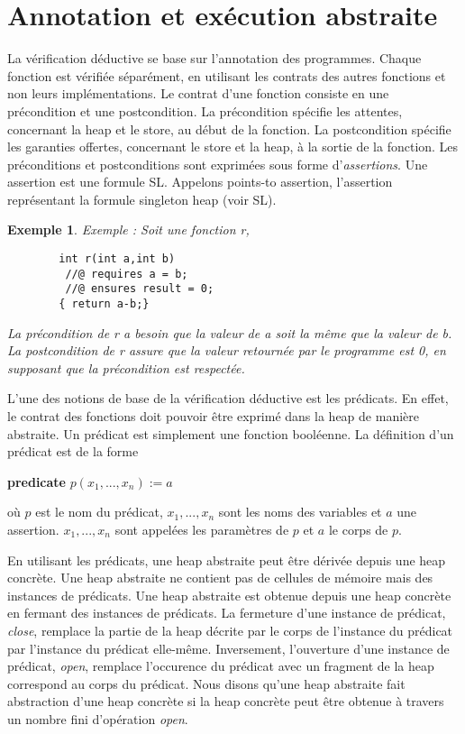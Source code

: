 \documentclass[9pt,openany]{book}
\newtheorem{exemple}{Exemple}
\begin{document}
	\section{Annotation et ex\'ecution abstraite}
		La v\'erification d\'eductive se base sur l'annotation des programmes. Chaque fonction est v\'erifi\'ee s\'epar\'ement, en utilisant les contrats des autres fonctions et non leurs impl\'ementations. Le contrat d'une fonction consiste en une pr\'econdition et une postcondition. La pr\'econdition sp\'ecifie les attentes, concernant la heap et le store, au d\'ebut de la fonction. La postcondition sp\'ecifie les garanties offertes, concernant le store et la heap, \`a la sortie de la fonction. Les pr\'econditions et postconditions sont exprim\'ees sous forme d'\textit{assertions}. Une assertion est une formule SL. Appelons points-to assertion, l'assertion repr\'esentant la formule singleton heap (voir SL).
		\begin{exemple}
		Exemple : Soit une fonction r,
		\begin{lstlisting}
		int r(int a,int b)
		 //@ requires a = b;
		 //@ ensures result = 0;
		{ return a-b;}
		\end{lstlisting}
		La pr\'econdition de r a besoin que la valeur de a soit la m\^eme que la valeur de b. La postcondition de r assure que la valeur retourn\'ee par le programme est 0, en supposant que la pr\'econdition est respect\'ee.
		\end{exemple}
	L'une des notions de base de la v\'erification d\'eductive est les pr\'edicats. En effet, le contrat des fonctions doit pouvoir \^etre exprim\'e dans la heap de mani\`ere abstraite. Un pr\'edicat est simplement une fonction bool\'eenne. La d\'efinition d'un pr\'edicat est de la forme
	\begin{center}
	
\textbf{predicate} $p(x_1,...,x_n):=a$

	\end{center}
o\`u $p$ est le nom du pr\'edicat, $x_1,...,x_n$ sont les noms des variables et $a$ une assertion. $x_1,...,x_n$ sont appel\'ees les param\`etres de $p$ et $a$ le corps de $p$.\par
	En utilisant les pr\'edicats, une heap abstraite peut \^etre d\'eriv\'ee depuis une heap concr\`ete. Une heap abstraite ne contient pas de cellules de m\'emoire mais des instances de pr\'edicats. Une heap abstraite est obtenue depuis une heap concr\`ete en fermant des instances de pr\'edicats. La fermeture d'une instance de pr\'edicat, \textit{close}, remplace la partie de la heap d\'ecrite par le corps de l'instance du pr\'edicat par l'instance du pr\'edicat elle-m\^eme. Inversement, l'ouverture d'une instance de pr\'edicat, \textit{open}, remplace l'occurence du pr\'edicat avec un fragment de la heap correspond au corps du pr\'edicat. Nous disons qu'une heap abstraite fait abstraction d'une heap concr\`ete si la heap concr\`ete peut \^etre obtenue \`a travers un nombre fini d'op\'eration \textit{open}.\\ 
\end{document}
